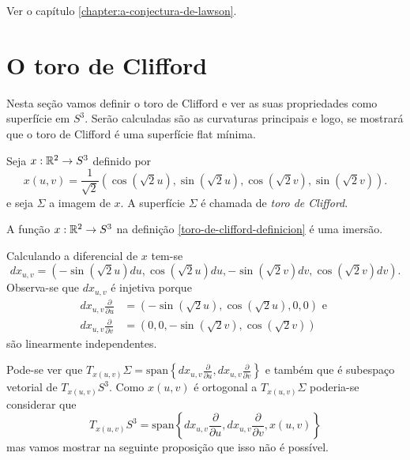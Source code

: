 \begin{demonstracao}
	Ver o capítulo \ref{chapter:a-conjectura-de-lawson}.
\end{demonstracao}

\section{O toro de Clifford}

Nesta seção vamos definir o toro de Clifford e ver as suas propriedades como superfície em $S^3$. Serão calculadas são as curvaturas principais e logo, se mostrará que o toro de Clifford é uma superfície flat mínima.

\begin{definicao}\label{toro-de-clifford-definicion}
	Seja
	$x: \mathbb R^2 \rightarrow S^3$
	definido por
	\begin{equation*}
	x(u,v) = \frac{1}{\sqrt{2}} \left(\cos(\sqrt{2} u), \sin(\sqrt{2} u), \cos(\sqrt{2} v), \sin(\sqrt{2} v)\right).
	\end{equation*}
	e seja $\Sigma$ a imagem de $x$. A superfície $\Sigma$ é chamada de \emph{toro de Clifford}.
\end{definicao}

\begin{proposicao}
	A função $x: \mathbb R^2 \rightarrow S^3$ na definição \ref{toro-de-clifford-definicion} é uma imersão.
\end{proposicao}

\begin{demonstracao}
	Calculando a diferencial de $x$ tem-se
	\begin{equation*}
	dx_{u,v} = \left(-\sin(\sqrt{2} u) du, \cos(\sqrt{2} u) du, -\sin(\sqrt{2} v) dv, \cos(\sqrt{2} v) dv\right).
	\end{equation*}
	Observa-se que $dx_{u,v}$ é injetiva porque
	\begin{align*}
	dx_{u,v} \frac{\partial}{\partial u} &= \left(-\sin(\sqrt{2} u), \cos(\sqrt{2} u), 0, 0\right) \text{ e }\\
	dx_{u,v} \frac{\partial}{\partial v} &= \left(0, 0, -\sin(\sqrt{2} v), \cos(\sqrt{2} v)\right)
	\end{align*}
	são linearmente independentes.
\end{demonstracao}
Pode-se ver que
$T_{x(u,v)} \Sigma = \text{span} \left\{dx_{u,v} \frac{\partial}{\partial u}, dx_{u,v} \frac{\partial}{\partial v}\right\}$
e também que é subespaço vetorial de
$T_{x(u,v)} S^3$.
Como $x(u,v)$ é ortogonal a $T_{x(u,v)} \Sigma$ poderia-se considerar que
\begin{equation*}
	T_{x(u,v)} S^3 = \text{span} \left\{dx_{u,v} \frac{\partial}{\partial u}, dx_{u,v} \frac{\partial}{\partial v}, x(u,v)\right\}
\end{equation*}
mas vamos mostrar na seguinte proposição que isso não é possível.

